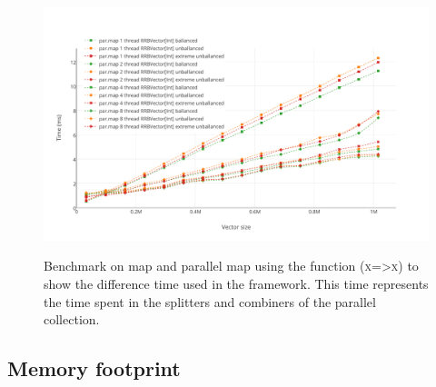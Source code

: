 \begin{figure}[h!]
  \centering
  \includegraphics[width=\textwidth]{Benchmarks/parmap_unbalanced.pdf}
  \label{ParallelUnbalancedBenchmarks}
  \caption{Benchmark on map and parallel map using the function (\textsc{x=>x}) to show the difference time used in the framework. This time represents the time spent in the splitters and combiners of the parallel collection.}
\end{figure}



\subsection{Memory footprint}

